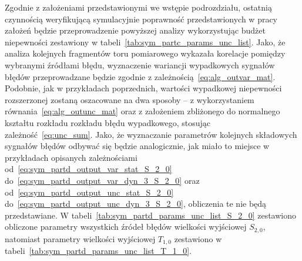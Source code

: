 Zgodnie z założeniami przedstawionymi we wstępie podrozdziału, ostatnią czynnością weryfikującą symulacyjnie poprawność przedstawionych w pracy założeń będzie przeprowadzenie powyższej analizy wykorzystując budżet niepewności zestawiony w tabeli~\ref{tab:sym_partc_params_unc_list}. Jako, że analiza kolejnych fragmentów toru pomiarowego wykazała korelacje pomiędzy wybranymi źródłami błędu, wyznaczenie wariancji wypadkowych sygnałów błędów przeprowadzane będzie zgodnie z zależnością~\eqref{eq:alg_outvar_mat}. Podobnie, jak w przykładach poprzednich, wartości wypadkowej niepewności rozszerzonej zostaną oszacowane na dwa sposoby -- z wykorzystaniem równania~\eqref{eq:alg_outunc_mat} oraz z założeniem zbliżonego do normalnego kształtu rozkładu rozkładu błędu wypadkowego, stosując zależność~\eqref{eq:unc_sum}. Jako, że wyznaczanie parametrów kolejnych składowych sygnałów błędów odbywać się będzie analogicznie, jak miało to miejsce w przykładach opisanych zależnościami od~\eqref{eq:sym_partd_output_var_stat_S_2_0} do~\eqref{eq:sym_partd_output_var_dyn_3_S_2_0} oraz od~\eqref{eq:sym_partd_output_unc_stat_S_2_0} do~\eqref{eq:sym_partd_output_unc_dyn_3_S_2_0}, obliczenia te nie będą przedstawiane. W tabeli~\ref{tab:sym_partd_params_unc_list_S_2_0} zestawiono obliczone parametry wszystkich źródeł błędów wielkości wyjściowej $S_{2,0}$, natomiast parametry wielkości wyjściowej $T_{1,0}$ zestawiono w tabeli~\ref{tab:sym_partd_params_unc_list_T_1_0}.

